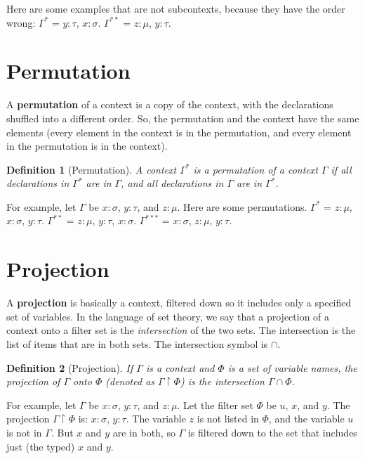 \documentclass{book}
\numberwithin{equation}{chapter}
\newcommand{\vocab}{\textbf}
\newtheorem{definition}{Definition}
\begin{document}
Here are some examples that are not subcontexts, because they have the order wrong: $\Gamma^{*}$ = $y : \tau$, $x: \sigma$. $\Gamma^{**}$ = $z : \mu$, $y : \tau$.


\section{Permutation}

A \vocab{permutation} of a context is a copy of the context, with the declarations shuffled into a different order. So, the permutation and the context have the same elements (every element in the context is in the permutation, and every element in the permutation is in the context).

\begin{definition}[Permutation]
A context $\Gamma^{*}$ is a permutation of a context $\Gamma$ if all declarations in $\Gamma^{*}$ are in $\Gamma$, and all declarations in $\Gamma$ are in $\Gamma^{*}$.
\end{definition}

\noindent
For example, let $\Gamma$ be $x: \sigma$, $y : \tau$, and $z : \mu$. Here are some permutations. $\Gamma^{*}$ = $z : \mu$, $x: \sigma$, $y : \tau$. $\Gamma^{**}$ = $z : \mu$, $y : \tau$, $x: \sigma$. $\Gamma^{***}$ = $x: \sigma$, $z : \mu$, $y : \tau$.


\section{Projection}

A \vocab{projection} is basically a context, filtered down so it includes only a specified set of variables. In the language of set theory, we say that a projection of a context onto a filter set is the \textit{intersection} of the two sets. The intersection is the list of items that are in both sets. The intersection symbol is $\cap$.

\begin{definition}[Projection]
If $\Gamma$ is a context and $\Phi$ is a set of variable names, the projection of $\Gamma$ onto $\Phi$ (denoted as $\Gamma \upharpoonright \Phi$) is the intersection $\Gamma \cap \Phi$.
\end{definition}

\noindent
For example, let $\Gamma$ be $x: \sigma$, $y : \tau$, and $z : \mu$. Let the filter set $\Phi$ be $u$, $x$, and $y$. The projection $\Gamma \upharpoonright \Phi$ is: $x : \sigma$, $y : \tau$. The variable $z$ is not listed in $\Phi$, and the variable $u$ is not in $\Gamma$. But $x$ and $y$ are in both, so $\Gamma$ is filtered down to the set that includes just (the typed) $x$ and $y$.
\end{document}

